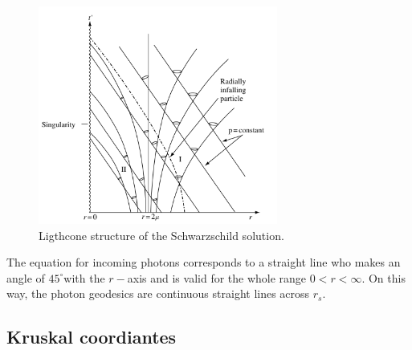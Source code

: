 \documentclass[letterpaper,11pt,onecolumn]{article}
\begin{document}
\begin{figure}[h!]
    \centering
    \includegraphics[width=0.7\textwidth]{Report/Images/4bhfinkelstein.png}
    \caption{Ligthcone structure of the Schwarzschild solution.}
\label{fig3}
\end{figure}
The equation for incoming photons corresponds to a straight line who makes an angle of $45^\circ$with the $r-$axis and is valid for the whole range $0<r<\infty$. On this way, the photon geodesics are continuous straight lines across $r_s$.   









\subsection{Kruskal coordiantes}









\printbibliography
\end{document}
